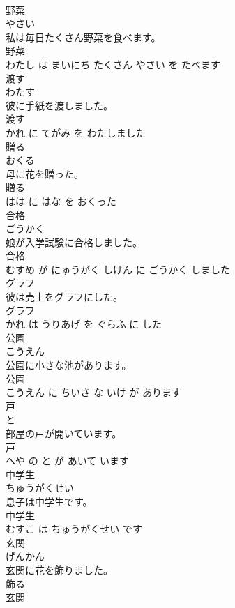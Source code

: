 \documentclass[8pt]{extreport}
\begin{document}
\begin{CJK}{UTF8}{min}
\\	野菜	
\\	やさい			
\\	私は毎日たくさん野菜を食べます。	
\\	野菜 
\\	わたし は まいにち たくさん やさい を たべます			
\\	渡す	
\\	わたす			
\\	彼に手紙を渡しました。	
\\	渡す 
\\	かれ に てがみ を わたしました			
\\	贈る	
\\	おくる			
\\	母に花を贈った。	
\\	贈る 
\\	はは に はな を おくった			
\\	合格	
\\	ごうかく			
\\	娘が入学試験に合格しました。	
\\	合格 
\\	むすめ が にゅうがく しけん に ごうかく しました			
\\	グラフ	
\\	彼は売上をグラフにした。	
\\	グラフ 
\\	かれ は うりあげ を ぐらふ に した			
\\	公園	
\\	こうえん			
\\	公園に小さな池があります。	
\\	公園 
\\	こうえん に ちいさ な いけ が あります			
\\	戸	
\\	と			
\\	部屋の戸が開いています。	
\\	戸 
\\	へや の と が あいて います			
\\	中学生	
\\	ちゅうがくせい			
\\	息子は中学生です。	
\\	中学生 
\\	むすこ は ちゅうがくせい です			
\\	玄関	
\\	げんかん			
\\	玄関に花を飾りました。	
\\	飾る 
\\	玄関 

\end{CJK}
\end{document}
